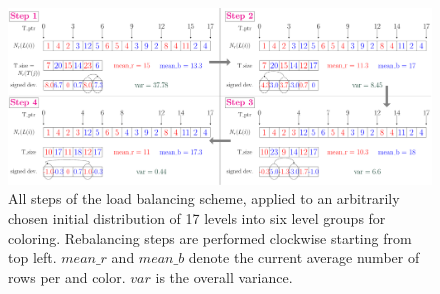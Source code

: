    \begin{figure}[t]
   	\centering
   	\includegraphics[width=\textwidth]{pics/load_balancing/lb_alg/lb_all}
   	\caption{All steps of the load balancing scheme, applied to an
          arbitrarily chosen initial distribution of 17 levels into six level
          groups for \DTWO coloring. Rebalancing steps are performed clockwise
          starting from top left. $mean\_r$ and $mean\_b$ denote the current
          average number of rows per \levelGroup and color. $var$ is the overall
          variance.}
   	\label{fig:lb_alg}
   \end{figure}
   
